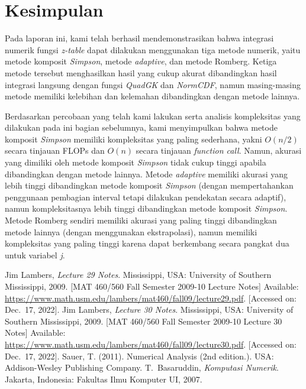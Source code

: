 \documentclass[journal,12pt,onecolumn,a4paper]{IEEEtran}
\begin{document}
\section{Kesimpulan}
Pada laporan ini, kami telah berhasil mendemonstrasikan bahwa integrasi numerik fungsi \emph{z-table} dapat dilakukan menggunakan tiga metode numerik, yaitu metode komposit \emph{Simpson}, metode \emph{adaptive}, dan metode Romberg. Ketiga metode tersebut menghasilkan hasil yang cukup akurat dibandingkan hasil integrasi langsung dengan fungsi \emph{QuadGK} dan \emph{NormCDF}, namun masing-masing metode memiliki kelebihan dan kelemahan dibandingkan dengan metode lainnya.

Berdasarkan percobaan yang telah kami lakukan serta analisis kompleksitas yang dilakukan pada ini bagian sebelumnya, kami menyimpulkan bahwa metode komposit \emph{Simpson} memiliki kompleksitas yang paling sederhana, yakni \(O(n/2)\) secara tinjauan FLOPs dan \(O(n)\) secara tinjauan \emph{function call}. Namun, akurasi yang dimiliki oleh metode komposit \emph{Simpson} tidak cukup tinggi apabila dibandingkan dengan metode lainnya. Metode \emph{adaptive} memiliki akurasi yang lebih tinggi dibandingkan metode komposit \emph{Simpson} (dengan mempertahankan penggunaan pembagian interval tetapi dilakukan pendekatan secara adaptif), namun kompleksitasnya lebih tinggi dibandingkan metode komposit \emph{Simpson}. Metode Romberg sendiri memiliki akurasi yang paling tinggi dibandingkan metode lainnya (dengan menggunakan ekstrapolasi), namun memiliki kompleksitas yang paling tinggi karena dapat berkembang secara pangkat dua untuk variabel \emph{j}.


\begin{thebibliography}{1}
	Jim Lambers, \emph{Lecture 29 Notes}.
	Mississippi, USA: University of Southern Mississippi, 2009. [MAT 460/560 Fall Semester 2009-10 Lecture Notes] Available: \url{https://www.math.usm.edu/lambers/mat460/fall09/lecture29.pdf}. [Accessed on: Dec.~17, 2022].
	Jim Lambers, \emph{Lecture 30 Notes}.
	Mississippi, USA: University of Southern Mississippi, 2009. [MAT 460/560 Fall Semester 2009-10 Lecture 30 Notes] Available: \url{https://www.math.usm.edu/lambers/mat460/fall09/lecture30.pdf}. [Accessed on: Dec.~17, 2022].
	 Sauer, T. (2011). Numerical Analysis (2nd edition.). USA: Addison-Wesley Publishing Company.
	T.~Basaruddin, \emph{Komputasi Numerik}. Jakarta, Indonesia: Fakultas Ilmu Komputer UI, 2007.
\end{thebibliography}
\end{document}
